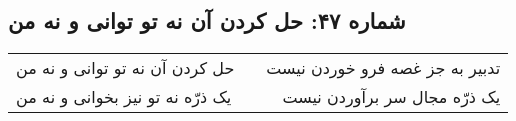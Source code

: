 \begin{center}
\section*{شماره ۴۷: حل کردن آن نه تو توانی و نه من}
\label{sec:047}
\begin{longtable}{l p{0.5cm} r}
حل کردن آن نه تو توانی و نه من
&&
تدبیر به جز غصه فرو خوردن نیست
\\
یک ذرّه نه تو نیز بخوانی و نه من
&&
یک ذرّه مجال سر برآوردن نیست
\\
\end{longtable}
\end{center}
